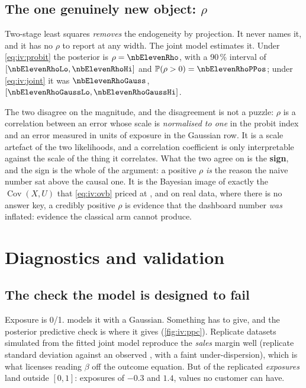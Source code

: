 


\subsection*{The one genuinely new object: $\rho$}

Two-stage least squares \emph{removes} the endogeneity by projection. It never names it, and it has
no $\rho$ to report at any width. The joint model estimates it. Under \cref{eq:iv:probit} the
posterior is $\rho = \nbElevenRho$, with a 90\,\% interval of $[\nbElevenRhoLo, \nbElevenRhoHi]$ and
$\Prob(\rho > 0) = \nbElevenRhoPPos$; under \cref{eq:iv:joint} it was $\nbElevenRhoGauss$,
$[\nbElevenRhoGaussLo, \nbElevenRhoGaussHi]$.

The two disagree on the magnitude, and the disagreement is not a puzzle: $\rho$ is a correlation
between an error whose scale is \emph{normalised to one} in the probit index and an error measured in
units of exposure in the Gaussian row. It is a scale artefact of the two likelihoods, and a
correlation coefficient is only interpretable against the scale of the thing it correlates. What the
two agree on is the \textbf{sign}, and the sign is the whole of the argument: a positive $\rho$
\emph{is} the reason the naive number sat above the causal one. It is the Bayesian image of exactly
the $\operatorname{Cov}(X, U)$ that \cref{eq:iv:ovb} priced at \eur{\nbElevenOvb}, and on real data,
where there is no answer key, a credibly positive $\rho$ is evidence that the dashboard number
\emph{was} inflated: evidence the classical arm cannot produce.

\section{Diagnostics and validation}
\label{sec:iv:valid}

\subsection*{The check the model is designed to fail}

Exposure is 0/1.  models it with a Gaussian. Something has to give, and the
posterior predictive check is where it gives (\cref{fig:iv:ppc}). Replicate datasets simulated from
the fitted joint model reproduce the \emph{sales} margin well (replicate standard deviation
\eur{\nbElevenPpcRepSd} against an observed \eur{\nbElevenPpcObsSd}, with a faint under-dispersion),
which is what licenses reading $\beta$ off the outcome equation. But \pc{\nbElevenPpcOutPct} of
the replicated \emph{exposures} land outside $[0, 1]$: exposures of $-0.3$ and $1.4$, values no
customer can have.

